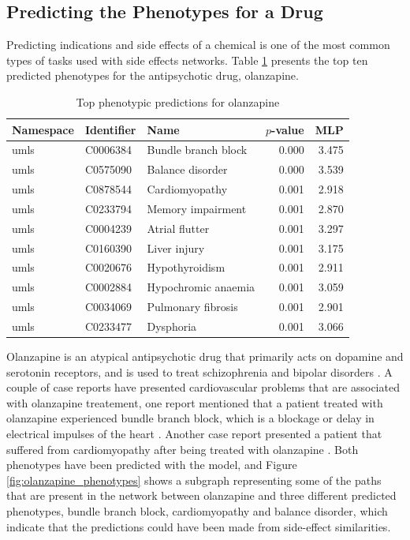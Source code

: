 \subsection{Predicting the Phenotypes for a Drug}
Predicting indications and side effects of a chemical is one of the most common types of tasks used with side effects networks. Table \ref{tab:drug_phenotype} presents the top ten predicted phenotypes for the antipsychotic drug, olanzapine.

\begin{table}[h]
    \centering
    \begin{tabular}{|l|l|l|r|r|} 
        \hline
        \textbf{Namespace} & \textbf{Identifier} & \textbf{Name} & \textbf{$p$-value} & \textbf{MLP} \\
        \hline
        umls & C0006384 & Bundle branch block & 0.000 & 3.475 \\
        \hline
        umls & C0575090 & Balance disorder & 0.000 & 3.539 \\
        \hline
        umls & C0878544 & Cardiomyopathy & 0.001 & 2.918 \\
        \hline
        umls & C0233794 & Memory impairment & 0.001 & 2.870 \\
        \hline
        umls & C0004239 & Atrial flutter & 0.001 & 3.297 \\
        \hline
        umls & C0160390 & Liver injury & 0.001 & 3.175 \\
        \hline
        umls & C0020676 & Hypothyroidism & 0.001 & 2.911 \\
        \hline
        umls & C0002884 & Hypochromic anaemia & 0.001 & 3.059 \\
        \hline
        umls & C0034069 & Pulmonary fibrosis & 0.001 & 2.901 \\
        \hline
        umls & C0233477 & Dysphoria & 0.001 & 3.066 \\
        \hline
    \end{tabular}
    \caption{Top phenotypic predictions for olanzapine}
    \label{tab:drug_phenotype}
\end{table}

Olanzapine is an atypical antipsychotic drug that primarily acts on dopamine and serotonin receptors, and is used to treat schizophrenia and bipolar disorders \cite{thomas_olanzapine_2019}. A couple of case reports have presented cardiovascular problems that are associated with olanzapine treatement, one report mentioned that a patient treated with olanzapine experienced bundle branch block, which is a blockage or delay in electrical impulses of the heart \cite{ninan_case_2017}. Another case report presented a patient that suffered from cardiomyopathy after being treated with olanzapine \cite{puttegowda_olanzapine_2016}. Both phenotypes have been predicted with the model, and Figure \ref{fig:olanzapine_phenotypes} shows a subgraph representing some of the paths that are present in the network between olanzapine and three different predicted phenotypes, bundle branch block, cardiomyopathy and balance disorder, which indicate that the predictions could have been made from side-effect similarities.

